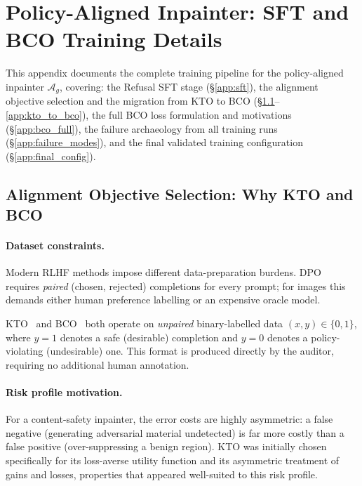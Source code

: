 
\section{Policy-Aligned Inpainter: SFT and BCO Training Details}

This appendix documents the complete training pipeline for the policy-aligned
inpainter $\mathcal{A}_g$, covering: the Refusal SFT stage
(\S\ref{app:sft}), the alignment objective selection and the migration from KTO to BCO (\S\ref{app:algo_choice}--\ref{app:kto_to_bco}), the full BCO loss formulation and motivations (\S\ref{app:bco_full}), the
failure archaeology from all training runs (\S\ref{app:failure_modes}), and
the final validated training configuration (\S\ref{app:final_config}).

\subsection{Alignment Objective Selection: Why KTO and BCO}
\label{app:algo_choice}

\paragraph{Dataset constraints.}
Modern RLHF methods impose different data-preparation burdens.
DPO~\cite{wallace2023diffusion_dpo} requires \emph{paired} (chosen, rejected)
completions for every prompt; for images this demands either human preference
labelling or an expensive oracle model.

KTO~\cite{li2024diffusion_kto} and BCO~\cite{jung2024bco} both operate on
\emph{unpaired} binary-labelled data $(x, y)\in\{0,1\}$, where $y=1$
denotes a safe (desirable) completion and $y=0$ denotes a policy-violating
(undesirable) one.
This format is produced directly by the auditor, requiring no
additional human annotation.

\paragraph{Risk profile motivation.}
For a content-safety inpainter, the error costs are highly asymmetric:
a false negative (generating adversarial material undetected) is far more
costly than a false positive (over-suppressing a benign region).
KTO was initially chosen specifically for its loss-averse utility function
and its asymmetric treatment of gains and losses, properties that appeared
well-suited to this risk profile.

